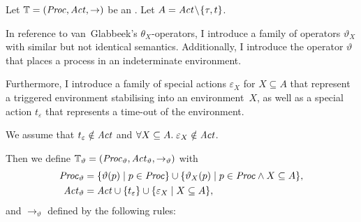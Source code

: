 %
\begin{isabellebody}%
%
%
\isadelimtheory
%
\endisadelimtheory
%
\isatagtheory
%
\endisatagtheory
{\isafoldtheory}%
%
\isadelimtheory
%
\endisadelimtheory
%
\isadelimdocument
%
\endisadelimdocument
%
\isatagdocument
%
\isamarkuptrue%
%
\endisatagdocument
{\isafolddocument}%
%
\isadelimdocument
%
\endisadelimdocument
%
\begin{isamarkuptext}%
\label{sec:mapping_lts}%
\end{isamarkuptext}\isamarkuptrue%
%
\begin{isamarkuptext}%
Let $\mathbb{T} = (\mathit{Proc}, \mathit{Act}, \rightarrow)$ be an \LTSt{}. Let $A = \mathit{Act} \!\setminus\! \{\tau, t\}$.

In reference to van~Glabbeek's $\theta_X$-operators, I introduce a family of operators $\vartheta_X$ with similar but not identical semantics. Additionally, I introduce the operator $\vartheta$ that places a process in an indeterminate environment.

Furthermore, I introduce a family of special actions $\varepsilon_X$ for $X \subseteq A$ that represent a triggered environment stabilising into an environment~$X$, as well as a special action $t_\varepsilon$ that represents a time-out of the environment.

We assume that $t_\varepsilon \notin \mathit{Act}$ and $\forall X \subseteq A.\; \varepsilon_X \notin \mathit{Act}$. 

Then we define $\mathbb{T}_\vartheta = (\mathit{Proc}_\vartheta, \mathit{Act}_\vartheta, \rightarrow_\vartheta)$ with
\begin{align*}
    \mathit{Proc}_\vartheta &= \{ \vartheta(p) \mid p \in \mathit{Proc} \} \cup \{ \vartheta_X(p) \mid p \in \mathit{Proc} \wedge X \subseteq A \}, \\
    \mathit{Act}_\vartheta &= \mathit{Act} \cup \{t_\varepsilon\} \cup \{ \varepsilon_X \mid X \subseteq A \},
\end{align*}
and $\rightarrow_\vartheta$ defined by the following rules:
\vspace{2\baselineskip}


\end{isamarkuptext}
\end{isabellebody}
